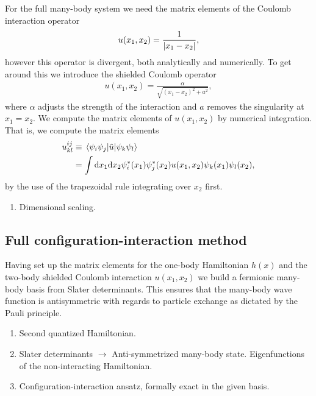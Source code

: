 \documentclass[twocolumn,superscriptaddress,unsortedaddress,
 amsmath,amssymb,
 aps,
]{revtex4-2}
\begin{document}
        For the full many-body system we need the matrix elements of the Coulomb
        interaction operator
        \begin{align}
            u(x_1, x_2) = \frac{1}{\abs{x_1 - x_2}},
        \end{align}
        however this operator is divergent, both analytically and numerically.
        To get around this we introduce the shielded Coulomb operator \cite{su-coulomb}
        \begin{align}
            u(x_1, x_2) = \frac{\alpha}{\sqrt{(x_1 - x_2)^2 + a^2}},
        \end{align}
        where $\alpha$ adjusts the strength of the interaction and $a$ removes
        the singularity at $x_1 = x_2$.
        We compute the matrix elements of $u(x_1, x_2)$ by numerical integration.
        That is, we compute the matrix elements
        \begin{align}
            u^{ij}_{kl}
            &\equiv \mel{\psi_i\psi_j}{\hat{u}}{\psi_k\psi_l}
            \\
            &= \int\dd x_1 \dd x_2
            \psi_i^{*}(x_1)\psi_j^{*}(x_2)u(x_1, x_2)
            \psi_k(x_1)\psi_l(x_2),
        \end{align}
        by the use of the trapezoidal rule integrating over $x_2$ first.
        
        \begin{enumerate}
            \item Dimensional scaling.
        \end{enumerate}

    \subsection{Full configuration-interaction method}
        Having set up the matrix elements for the one-body Hamiltonian $h(x)$ and the
        two-body shielded Coulomb interaction $u(x_1, x_2)$ we build a fermionic
        many-body basis from Slater determinants.
        This ensures that the many-body wave function is antisymmetric with regards to
        particle exchange as dictated by the Pauli principle.

        \begin{enumerate}
            \item Second quantized Hamiltonian.
            \item Slater determinants $\to$ Anti-symmetrized many-body state.
                Eigenfunctions of the non-interacting Hamiltonian.
            \item Configuration-interaction ansatz, formally exact in the given basis.
        \end{enumerate}
        
\end{document}
